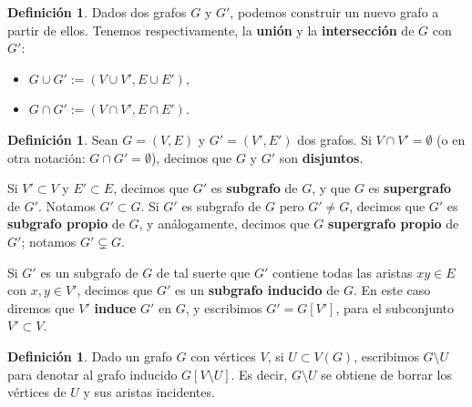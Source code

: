 \documentclass[12pt]{report}
\theoremstyle{plain}
\theoremstyle{definition}
\newtheorem{definition}[theorem]{Definición}
\begin{document}
\begin{definition}
Dados dos grafos $G$ y $G'$, podemos construir un nuevo grafo a partir de ellos. Tenemos respectivamente, la \textbf{unión} y la \textbf{intersección} de $G$ con $G'$:
\begin{itemize}
\item $G \cup G' := (V \cup V', E \cup E')$,
\item $G \cap G' := (V \cap V' , E \cap E')$.
\end{itemize}
\end{definition}


\begin{definition}
Sean $G = (V,E)$ y $G' = (V', E')$ dos grafos. Si $V \cap V' = \emptyset$ (o en otra notación: $G \cap G' = \emptyset$), decimos que $G$ y $G'$ son \textbf{disjuntos}.

Si $V' \subset V$ y $E' \subset E$, decimos que $G'$ es \textbf{subgrafo} de $G$, y que $G$ es \textbf{supergrafo} de $G'$. Notamos $G' \subset G$. Si $G'$ es subgrafo de $G$ pero $G' \neq G$, decimos que $G'$ es \textbf{subgrafo propio} de $G$, y análogamente, decimos que $G$ \textbf{supergrafo propio} de $G'$; notamos $G' \subsetneq G$.

Si $G'$ es un subgrafo de $G$ de tal suerte que $G'$ contiene todas las aristas $xy \in E$ con $x,y \in V'$, decimos que $G'$ es un \textbf{subgrafo inducido} de $G$. En este caso diremos que $V'$ \textbf{induce} $G'$ en $G$, y escribimos $G' = G[V']$, para el subconjunto $V' \subset V$.
\end{definition}







\begin{definition}
Dado un grafo $G$ con vértices $V$, si $U \subset V(G)$, escribimos $G \setminus U$ para denotar al grafo inducido $G[V \setminus U]$. Es decir, $G \setminus U$ se obtiene de borrar los vértices de $U$ y sus aristas incidentes.
\end{definition}
\end{document}
